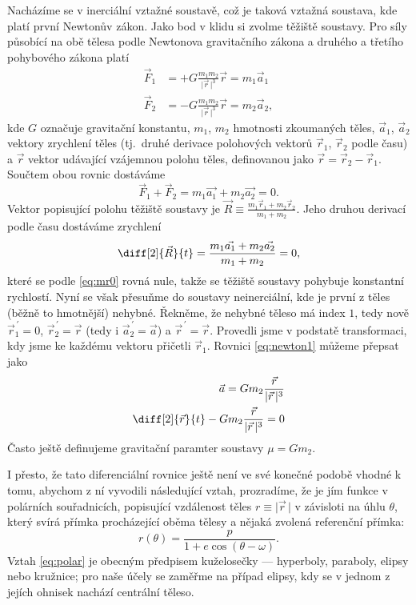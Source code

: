 \documentclass[A4paper, 12pt, oneside]{book}
\newcommand{\ap}{{\,\prime}}
\newcommand{\abs}[1]{\lvert #1 \,\rvert}
\begin{document}
Nacházíme se v inerciální vztažné soustavě, což je taková vztažná soustava, kde platí první Newtonův zákon. Jako bod v klidu si zvolme těžiště soustavy. Pro síly působící na obě tělesa podle Newtonova gravitačního zákona a druhého a třetího pohybového zákona platí
\begin{align} 
	\vec{F}_1 &= +G\frac{m_1m_2}{\abs{\vec{r}}^3}\vec{r} = m_1\vec{a}_1 \label{eq:newton1} \\
	\vec{F}_2 &= -G\frac{m_1m_2}{\abs{\vec{r}}^3}\vec{r} = m_2\vec{a}_2, \label{eq:newton2}
\end{align}
kde $G$ označuje gravitační konstantu, $m_1$, $m_2$ hmotnosti zkoumaných těles, $\vec{a}_1$, $\vec{a}_2$ vektory zrychlení těles (tj.\ druhé derivace polohových vektorů $\vec{r}_1$, $\vec{r}_2$ podle času) a $\vec{r}$ vektor udávající vzájemnou polohu těles, definovanou jako $\vec{r} = \vec{r}_2 - \vec{r}_1$. Součtem obou rovnic dostáváme
\begin{equation} \label{eq:mr0}
	\vec{F}_1 + \vec{F}_2 = m_1\vec{a_1} + m_2\vec{a_2} = 0.
\end{equation}
Vektor popisující polohu těžiště soustavy je $\vec{R} \equiv \frac{m_1\vec{r}_1 + m_2\vec{r}_2}{m_1 + m_2}$. Jeho druhou derivací podle času dostáváme zrychlení
\begin{equation*}
	\diff[2]{\vec{R}}{t} = \frac{m_1\vec{a_1} + m_2\vec{a_2}}{m_1+m_2} = 0,
\end{equation*}
které se podle \eqref{eq:mr0} rovná nule, takže se těžiště soustavy pohybuje konstantní rychlostí.
\newpage
Nyní se však přesuňme do soustavy neinerciální, kde je první z těles (běžně to hmotnější) nehybné. Řekněme, že nehybné těleso má index $1$, tedy nově $\vec{r}^\ap_1=0$, $\vec{r}^\ap_2=\vec{r}$ (tedy i $\vec{a}^\ap_2 = \vec{a}$) a $\vec{r}^\ap=\vec{r}$. Provedli jsme v podstatě transformaci, kdy jsme ke každému vektoru přičetli $\vec{r}_1$.  Rovnici \eqref{eq:newton1} můžeme přepsat jako
\begin{align}
	\nonumber {\vec{a}} = Gm_2\frac{\vec{r}}{\abs{\vec{r}}^3} \\
		\diff[2]{\vec{r}}{t} - Gm_2\frac{\vec{r}}{\abs{\vec{r}}^3} = 0	
\end{align}
Často ještě definujeme gravitační paramter soustavy $\mu=Gm_2$.

I přesto, že tato diferenciální rovnice ještě není ve své konečné podobě vhodné k tomu, abychom z ní vyvodili následující vztah, prozradíme, že je jím funkce v polárních souřadnicích, popisující vzdálenost těles $r\equiv\abs{\vec{r}}$ v závisloti na úhlu $\theta$, který svírá přímka procházející oběma tělesy a nějaká zvolená referenční přímka:
\begin{equation} \label{eq:polar}
	r(\theta)=\frac{p}{1+e\cos{(\theta-\omega)}}.
\end{equation}
Vztah \eqref{eq:polar} je obecným předpisem kuželosečky --- hyperboly, paraboly, elipsy nebo kružnice; pro naše účely se zaměřme na případ elipsy, kdy se v jednom z jejích ohnisek nachází centrální těleso.
\end{document}
